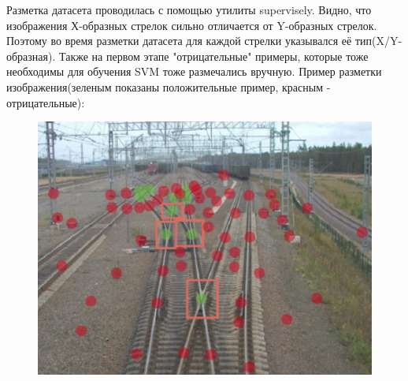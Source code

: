 \newpage
Разметка датасета проводилась с помощью утилиты supervisely.
Видно, что изображения Х-образных стрелок сильно отличается от Y-образных стрелок. Поэтому во время разметки датасета для каждой стрелки указывался её тип(X/Y-образная). Также на первом этапе "отрицательные" примеры, которые тоже необходимы для обучения SVM тоже размечались вручную. Пример разметки изображения(зеленым показаны положительные пример, красным - отрицательные):
\begin{figure}[h!]
	\centering
	\includegraphics[width=1\linewidth]{pictures/screenshot2}
	\caption{}
	\label{fig:screenshot2}
\end{figure}


